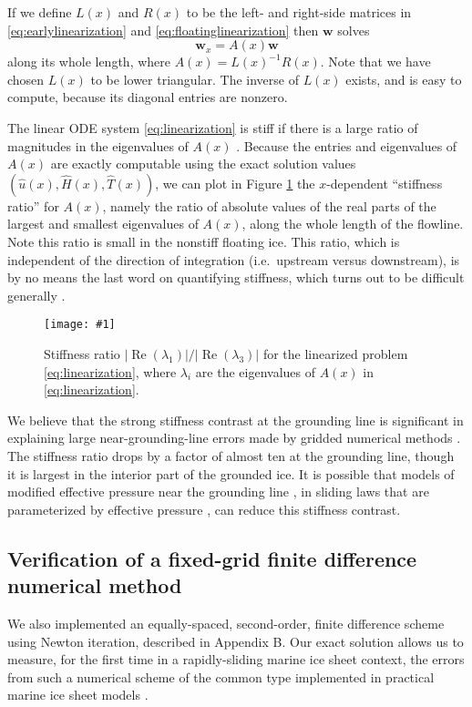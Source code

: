 \documentclass[twocolumn,letterpaper]{igs}
\newcommand{\onecol}[1]{\texttt{[image: \#1]}}
\newcommand{\bw}{\mathbf{w}}
\newcommand{\hu}{\hat u}
\newcommand{\hH}{\hat H}
\newcommand{\hT}{\hat T}
\begin{document}
If we define $L(x)$ and $R(x)$ to be the left- and right-side matrices in \eqref{eq:earlylinearization} and \eqref{eq:floatinglinearization} then $\bw$ solves
\begin{equation}
\bw_x = A(x) \bw \label{eq:linearization}
\end{equation}
along its whole length, where $A(x) = L(x)^{-1} R(x)$.  Note that we have chosen $L(x)$ to be lower triangular.  The inverse of $L(x)$ exists, and is easy to compute, because its diagonal entries are nonzero.

The linear ODE system \eqref{eq:linearization} is stiff if there is a large ratio of magnitudes in the eigenvalues of $A(x)$ \citep{Pressetal}.  Because the entries and eigenvalues of $A(x)$ are exactly computable using the exact solution values $(\hu(x),\hH(x),\hT(x))$, we can plot in Figure \ref{fig:stiffness} the $x$-dependent ``stiffness ratio'' for $A(x)$, namely the ratio of absolute values of the real parts of the largest and smallest eigenvalues of $A(x)$, along the whole length of the flowline.  Note this ratio is small in the nonstiff floating ice.  This ratio, which is independent of the direction of integration (i.e.~upstream versus downstream), is by no means the last word on quantifying stiffness, which turns out to be difficult generally \citep[e.g.][]{HighamTrefethen1993}.

\begin{figure}[ht]
\onecol{em-stiffness-ratio}
\caption{Stiffness ratio $|\operatorname{Re}(\lambda_1)|/|\operatorname{Re}(\lambda_3)|$ for the linearized problem \eqref{eq:linearization}, where $\lambda_i$ are the eigenvalues of $A(x)$ in \eqref{eq:linearization}.} \label{fig:stiffness}
\end{figure}

We believe that the strong stiffness contrast at the grounding line is significant in explaining large near-grounding-line errors made by gridded numerical methods \citep{Gladstoneetal2010,MISMIP2012}.  The stiffness ratio drops by a factor of almost ten at the grounding line, though it is largest in the interior part of the grounded ice.  It is possible that models of modified effective pressure near the grounding line \citep{Leguyetal2014TCD}, in sliding laws that are parameterized by effective pressure \citep{Schoof2005cavitation}, can reduce this stiffness contrast.

\subsection*{Verification of a fixed-grid finite difference numerical method}  We also implemented an equally-spaced, second-order, finite difference scheme using Newton iteration, described in Appendix B.  Our exact solution allows us to measure, for the first time in a rapidly-sliding marine ice sheet context, the errors from such a numerical scheme of the common type implemented in practical marine ice sheet models \citep[e.g.][]{PollardDeConto2009WAIS,Winkelmannetal2011}.
\end{document}
